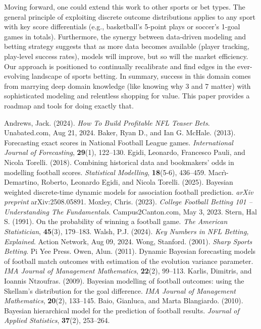 \documentclass[12pt]{article}
\begin{document}
Moving forward, one could extend this work to other sports or bet types. The general principle of exploiting discrete outcome distributions applies to any sport with key score differentials (e.g., basketball’s 5-point plays or soccer’s 1-goal games in totals). Furthermore, the synergy between data-driven modeling and betting strategy suggests that as more data becomes available (player tracking, play-level success rates), models will improve, but so will the market efficiency. Our approach is positioned to continually recalibrate and find edges in the ever-evolving landscape of sports betting. In summary, success in this domain comes from marrying deep domain knowledge (like knowing why 3 and 7 matter) with sophisticated modeling and relentless shopping for value. This paper provides a roadmap and tools for doing exactly that.

\begin{thebibliography}{99}
 Andrews, Jack. (2024). \textit{How To Build Profitable NFL Teaser Bets}. Unabated.com, Aug 21, 2024.
 Baker, Ryan D., and Ian G. McHale. (2013). Forecasting exact scores in National Football League games. \textit{International Journal of Forecasting}, \textbf{29}(1), 122--130.
 Egidi, Leonardo, Francesco Pauli, and Nicola Torelli. (2018). Combining historical data and bookmakers' odds in modelling football scores. \textit{Statistical Modelling}, \textbf{18}(5-6), 436--459.
 Macr\`{\i}-Demartino, Roberto, Leonardo Egidi, and Nicola Torelli. (2025). Bayesian weighted discrete-time dynamic models for association football prediction. \textit{arXiv preprint} arXiv:2508.05891.
 Moxley, Chris. (2023). \textit{College Football Betting 101 -- Understanding The Fundamentals}. Campus2Canton.com, May 3, 2023.
 Stern, Hal S. (1991). On the probability of winning a football game. \textit{The American Statistician}, \textbf{45}(3), 179--183.
 Walsh, P.J. (2024). \textit{Key Numbers in NFL Betting, Explained}. Action Network, Aug 09, 2024.
 Wong, Stanford. (2001). \textit{Sharp Sports Betting}. Pi Yee Press.
 Owen, Alun. (2011). Dynamic Bayesian forecasting models of football match outcomes with estimation of the evolution variance parameter. \textit{IMA Journal of Management Mathematics}, \textbf{22}(2), 99--113.
 Karlis, Dimitris, and Ioannis Ntzoufras. (2009). Bayesian modelling of football outcomes: using the Skellam's distribution for the goal difference. \textit{IMA Journal of Management Mathematics}, \textbf{20}(2), 133--145.
 Baio, Gianluca, and Marta Blangiardo. (2010). Bayesian hierarchical model for the prediction of football results. \textit{Journal of Applied Statistics}, \textbf{37}(2), 253--264.
\end{thebibliography}
\end{document}
